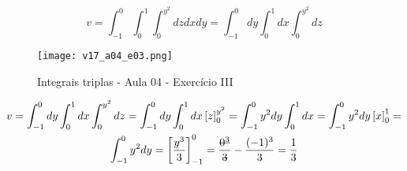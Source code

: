 \begin{enumerate}
	\begin{equation*}
		v = \int_{-1}^0 \int_0^1 \int_0^{y^2} dzdxdy = \int_{-1}^0 dy \int_0^1 dx \int_0^{y^2} dz	
	\end{equation*}
	
	\begin{figure}[htb]
		\caption{Integrais triplas - Aula 04 - Exercício III}
		\label{v17_a04_e03}
		\centering
		\texttt{[image: v17\_a04\_e03.png]}		
	\end{figure}
	
	\begin{gather*}
		v = \int_{-1}^0 dy \int_0^1 dx \int_0^{y^2} dz = \int_{-1}^0 dy \int_0^1 dx \left[z\right]_0^{y^2} = \int_{-1}^0 y^2 dy \int_0^1 dx = \int_{-1}^0 y^2 dy \left[x\right]_0^1 =\\ \int_{-1}^0 y^2 dy = \left[\dfrac{y^3}{3}\right]_{-1}^0 = \dfrac{\overstrike{0^3}}{\overstrike{3}} - \dfrac{(-1)^3}{3} = \dfrac{1}{3}
	\end{gather*}
\end{enumerate}